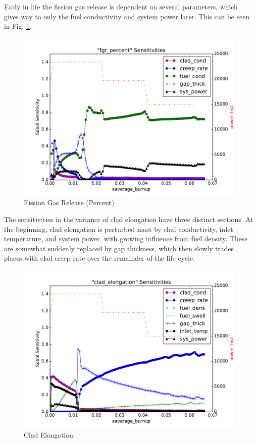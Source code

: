 \documentclass{anstrans} \usepackage{amsmath} \usepackage{amssymb}
\begin{document}
Early in life the fission gas release is dependent on several parameters, which gives way to only the fuel
conductivity and system power later.  This can be seen in Fig. \ref{fig:fgr}.
\begin{figure}[htb]
  \centering
  \includegraphics[width=\linewidth]{./sens_fgr_percent}
  \caption{Fission Gas Release (Percent)}
  \label{fig:fgr}
\end{figure}
The sensitivities in the variance of clad elongation have three distinct sections.  At the beginning, clad
elongation is perturbed most by clad conductivity, inlet temperature, and system power, with growing influence
from fuel density.  These are somewhat suddenly replaced by gap thickness, which then slowly trades places
with clad creep rate over the remainder of the life cycle.
\begin{figure}[htb]
  \centering
  \includegraphics[width=\linewidth]{./sens_clad_elongation}
  \caption{Clad Elongation}
  \label{fig:elong}
\end{figure}
\end{document}
